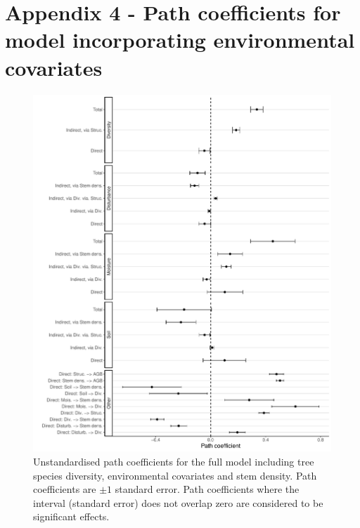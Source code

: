 \documentclass[11pt,a4paper]{article}
\begin{document}
\section{Appendix 4 - Path coefficients for model incorporating environmental covariates} \label{appendixd}

\begin{figure}[H]
\centering
	\includegraphics[width=\textwidth]{full_model_slopes}
	\caption{Unstandardised path coefficients for the full model including tree species diversity, environmental covariates and stem density. Path coefficients are $\pm1$ standard error. Path coefficients where the interval (standard error) does not overlap zero are considered to be significant effects.}
	\label{full_model_slopes}
\end{figure}
\end{document}
